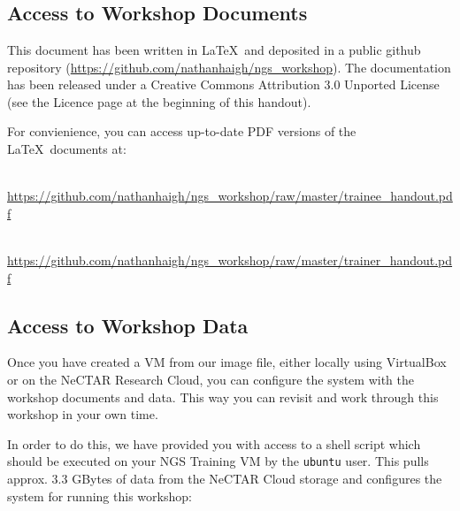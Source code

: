 
\chapter{\moduleTitle}
\newpage

\section{Access to Workshop Documents}

This document has been written in \LaTeX\ and deposited in a public github
repository (\url{https://github.com/nathanhaigh/ngs_workshop}). The
documentation has been released under a Creative Commons Attribution 3.0
Unported License (see the Licence page at the beginning of this handout).

For convienience, you can access up-to-date PDF versions of the \LaTeX\ documents at:
\begin{description}[style=multiline,labelindent=0cm,align=left,leftmargin=0.5cm]
\item[Trainee Handout]\hfill\\
\url{https://github.com/nathanhaigh/ngs_workshop/raw/master/trainee_handout.pdf}
\item[Trainer Handout]\hfill\\
\url{https://github.com/nathanhaigh/ngs_workshop/raw/master/trainer_handout.pdf}
\end{description}

\section{Access to Workshop Data}
Once you have created a VM from our image file, either locally using VirtualBox
or on the NeCTAR Research Cloud, you can configure the system with the workshop
documents and data. This way you can revisit and work through this workshop in
your own time.

In order to do this, we have provided you with access to a shell script which
should be executed on your NGS Training VM by the \texttt{ubuntu} user. This pulls
approx. 3.3 GBytes of data from the NeCTAR Cloud storage and configures the system
for running this workshop:

